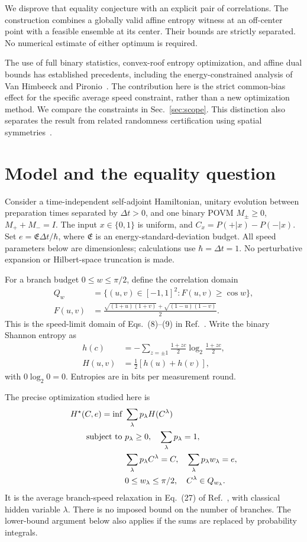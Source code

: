 \documentclass[aps,pra,reprint,amsmath,amssymb,longbibliography,nofootinbib]{revtex4-2}
\newcommand{\Hs}{H^{\star}}
\begin{document}
We disprove that equality conjecture with an explicit pair of correlations.
The construction combines a globally valid affine entropy witness at an
off-center point with a feasible ensemble at its center. Their bounds are
strictly separated. No numerical estimate of either optimum is required.

The use of full binary statistics, convex-roof entropy optimization, and
affine dual bounds has established precedents, including the energy-constrained
analysis of Van Himbeeck and Pironio~\cite{VanHimbeeck2019}.
The contribution here is the strict common-bias effect for the specific
average speed constraint, rather than a new optimization method. We compare
the constraints in Sec.~\ref{sec:scope}. This distinction also separates the
result from related randomness certification using spatial
symmetries~\cite{JonesSpatial2026}.

\section{Model and the equality question}\label{sec:model}

Consider a time-independent self-adjoint Hamiltonian, unitary evolution
between preparation times separated by $\Delta t>0$, and one binary POVM
$M_\pm\geq0$, $M_++M_-=I$. The input $x\in\{0,1\}$ is uniform, and
$C_x=P(+|x)-P(-|x)$. Set
$e=\mathfrak E\Delta t/\hbar$, where $\mathfrak E$ is an energy-standard-deviation
budget. All speed parameters below are dimensionless; calculations use
$\hbar=\Delta t=1$. No perturbative expansion or Hilbert-space truncation is
made.

For a branch budget $0\leq w\leq\pi/2$, define the correlation domain
\begin{align}
 Q_w&=\{(u,v)\in[-1,1]^2:F(u,v)\geq\cos w\},\label{eq:Q}\\
 F(u,v)&=\frac{\sqrt{(1+u)(1+v)}+\sqrt{(1-u)(1-v)}}{2}.
 \label{eq:F}
\end{align}
This is the speed-limit domain of Eqs.~(8)--(9) in
Ref.~\cite{JonesSpeed2026}. Write the binary Shannon entropy as
\begin{align}
 h(c)&=-\sum_{z=\pm1}\frac{1+zc}{2}\log_2\frac{1+zc}{2},\label{eq:h}\\
 H(u,v)&=\tfrac12[h(u)+h(v)],\label{eq:H}
\end{align}
with $0\log_2 0=0$. Entropies are in bits per measurement round.

The precise optimization studied here is
\begin{align}
 \Hs(C,e)=\inf\;&\sum_\lambda p_\lambda H(C^\lambda)\notag\\
 \text{subject to }&p_\lambda\geq0,\quad\sum_\lambda p_\lambda=1,\notag\\
 &\sum_\lambda p_\lambda C^\lambda=C,\quad
   \sum_\lambda p_\lambda w_\lambda=e,\label{eq:roof}\\
 &0\leq w_\lambda\leq\pi/2,\quad C^\lambda\in Q_{w_\lambda}.\notag
\end{align}
It is the average branch-speed relaxation in Eq.~(27) of
Ref.~\cite{JonesSpeed2026}, with classical hidden variable $\lambda$.
There is no imposed bound on the number of branches. The lower-bound
argument below also applies if the sums are replaced by probability
integrals.
\end{document}
